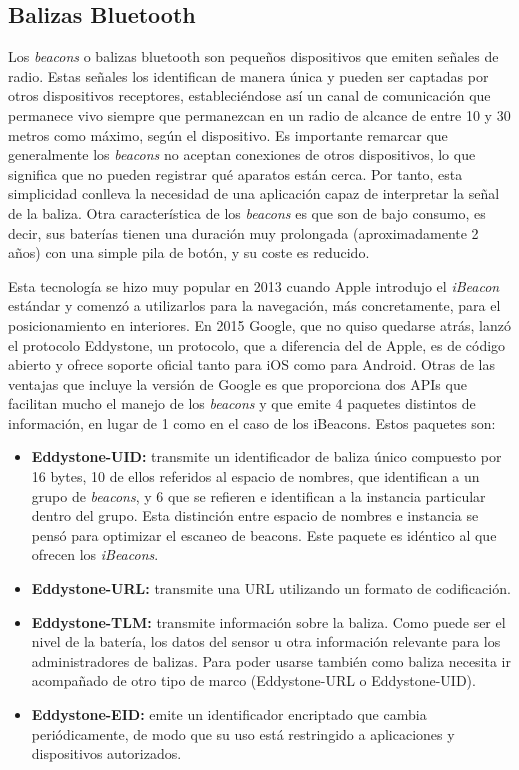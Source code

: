 \subsection{Balizas Bluetooth}

Los \textit{beacons} o balizas bluetooth son pequeños dispositivos que emiten señales de radio. Estas señales los identifican de manera única y pueden ser captadas por otros dispositivos receptores, estableciéndose así un canal de comunicación que permanece vivo siempre que permanezcan en un radio de alcance de entre 10 y 30 metros como máximo, según el dispositivo. Es importante remarcar que generalmente los \textit{beacons} no aceptan conexiones de otros dispositivos, lo que significa que no pueden registrar qué aparatos están cerca. Por tanto, esta simplicidad conlleva la necesidad de una aplicación capaz de interpretar la señal de la baliza. Otra característica de los \textit{beacons} es que son de bajo consumo, es decir, sus baterías tienen una duración muy prolongada (aproximadamente 2 años) con una simple pila de botón, y su coste es reducido.

Esta tecnología se hizo muy popular en 2013 cuando Apple introdujo el \textit{iBeacon} estándar y comenzó a utilizarlos para la navegación, más concretamente, para el posicionamiento en interiores. En 2015 Google, que no quiso quedarse atrás, lanzó el protocolo Eddystone, un protocolo, que a diferencia del de Apple, es de código abierto y ofrece soporte oficial tanto para iOS como para Android. Otras de las ventajas que incluye la versión de Google es que proporciona dos APIs que facilitan mucho el manejo de los \textit{beacons} y que emite 4 paquetes distintos de información, en lugar de 1 como en el caso de los iBeacons. Estos paquetes son:

\begin{itemize}
	\item \textbf{Eddystone-UID:} transmite un identificador de baliza único compuesto por 16 bytes, 10 de ellos referidos al espacio de nombres, que identifican a un grupo de \textit{beacons}, y 6 que se refieren e identifican a la instancia particular dentro del grupo. Esta distinción entre espacio de nombres e instancia se pensó para optimizar el escaneo de beacons. Este paquete es idéntico al que ofrecen los \textit{iBeacons}.
	\item \textbf{Eddystone-URL:} transmite una URL utilizando un formato de codificación.
	\item \textbf{Eddystone-TLM:} transmite información sobre la baliza. Como puede ser el nivel de la batería, los datos del sensor u otra información relevante para los administradores de balizas. Para poder usarse también como baliza necesita ir acompañado de otro tipo de marco (Eddystone-URL o Eddystone-UID).
	\item \textbf{Eddystone-EID:} emite un identificador encriptado que cambia periódicamente, de modo que su uso está restringido a aplicaciones y dispositivos autorizados.
\end{itemize}

